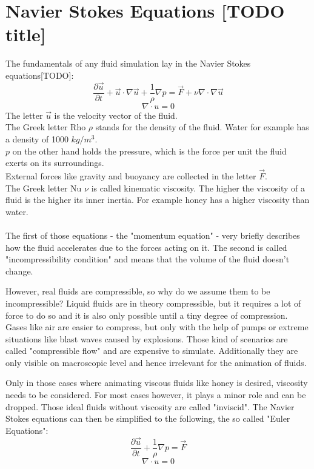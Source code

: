 \chapter{Navier Stokes Equations [TODO title]}\label{chapter:cudapressuresolver}

The fundamentals of any fluid simulation lay in the Navier Stokes equations[TODO]:\\
\begin{equation} \label{navier-stokes1}
\frac{\partial \vec{u}}{\partial t} + \vec{u} \cdot \nabla \vec{u} + \frac{1}{\rho}  \nabla p = \vec{F} + \nu \nabla \cdot \nabla \vec{u}
\end{equation}
\begin{equation} \label{navier-stokes2}
\nabla \cdot u = 0
\end{equation}
The letter $\vec{u}$ is the velocity vector of the fluid.\\
The Greek letter Rho $\rho$ stands for the density of the fluid. Water for example has a density of 1000 $kg/m^3$. \\
$p$ on the other hand holds the pressure, which is the force per unit the fluid exerts on its surroundings.\\
External forces like gravity and buoyancy are collected in the letter $\vec{F}$.\\
The Greek letter Nu $\nu$ is called kinematic viscosity. The higher the viscosity of a fluid is the higher its inner inertia. For example honey has a higher viscosity than water.\\\\
The first of those equations - the "momentum equation" - very briefly describes how the fluid accelerates due to the forces acting on it. The second is called "incompressibility condition" and means that the volume of the fluid doesn't change.
\par However, real fluids are compressible, so why do we assume them to be incompressible? Liquid fluids are in theory compressible, but it requires a lot of force to do so and it is also only possible until a tiny degree of compression. Gases like air are easier to compress, but only with the help of pumps or extreme situations like blast waves caused by explosions. Those kind of scenarios are called "compressible flow" and are expensive to simulate. Additionally they are only visible on macroscopic level and hence irrelevant for the animation of fluids.
\par Only in those cases where animating viscous fluids like honey is desired, viscosity needs to be considered. For most cases however, it plays a minor role and can be dropped. Those ideal fluids without viscosity are called "inviscid". The Navier Stokes equations can then be simplified to the following, the so called "Euler Equations":
\begin{equation} \label{navier-stokes12}
\frac{\partial \vec{u}}{\partial t} + \frac{1}{\rho}  \nabla p = \vec{F}
\end{equation}
\begin{equation} \label{navier-stokes22}
\nabla \cdot u = 0
\end{equation}


